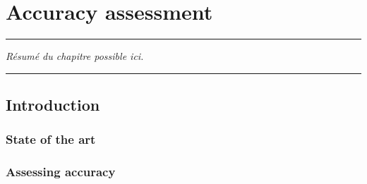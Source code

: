 
\lhead[\fancyplain{}{\leftmark}]%
      {\fancyplain{}{}} %
\chead[\fancyplain{}{}]%
      {\fancyplain{}{}}
\rhead[\fancyplain{}{}]%
      {\fancyplain{}{\rightmark}}%
\lfoot[\fancyplain{}{}]%
      {\fancyplain{}{}}
\cfoot[\fancyplain{}{\thepage}]%
      {\fancyplain{}{\thepage}} %
\rfoot[\fancyplain{}{}]%
     {\fancyplain{}{\scriptsize}}



\chapter{Accuracy assessment}
\label{ch:5}


\begin{center}
\rule{0.7\linewidth}{.5pt}
\begin{minipage}{0.7\linewidth}
\smallskip

\textit{Résumé du chapitre possible ici.
}

\end{minipage}
\smallskip
\rule{0.7\linewidth}{.5pt}
\end{center}

\minitoc
\newpage


\section{Introduction}
\subsection{State of the art}
\blindtext

\subsection{Assessing accuracy}
\blindtext


